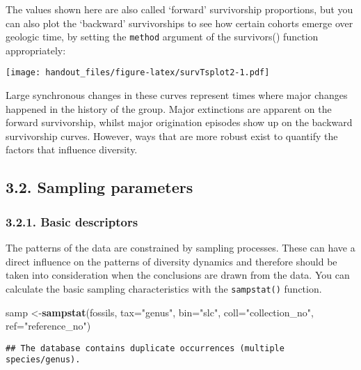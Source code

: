 \documentclass[]{article}
\newenvironment{Shaded}{\begin{snugshade}}{\end{snugshade}}
\newcommand{\KeywordTok}[1]{\textcolor[rgb]{0.13,0.29,0.53}{\textbf{{#1}}}}
\newcommand{\DataTypeTok}[1]{\textcolor[rgb]{0.13,0.29,0.53}{{#1}}}
\newcommand{\StringTok}[1]{\textcolor[rgb]{0.31,0.60,0.02}{{#1}}}
\newcommand{\NormalTok}[1]{{#1}}
\begin{document}
The values shown here are also called `forward' survivorship
proportions, but you can also plot the `backward' survivorships to see
how certain cohorts emerge over geologic time, by setting the
\texttt{method} argument of the survivors() function appropriately:

\texttt{[image: handout\_files/figure-latex/survTsplot2-1.pdf]}

Large synchronous changes in these curves represent times where major
changes happened in the history of the group. Major extinctions are
apparent on the forward survivorship, whilst major origination episodes
show up on the backward survivorship curves. However, ways that are more
robust exist to quantify the factors that influence diversity.

\subsection{3.2. Sampling parameters}\label{sampling-parameters}

\subsubsection{3.2.1. Basic descriptors}\label{basic-descriptors}

The patterns of the data are constrained by sampling processes. These
can have a direct influence on the patterns of diversity dynamics and
therefore should be taken into consideration when the conclusions are
drawn from the data. You can calculate the basic sampling
characteristics with the \texttt{sampstat()} function.

\begin{Shaded}
\begin{Highlighting}[]
\NormalTok{samp <-}\KeywordTok{sampstat}\NormalTok{(fossils, }\DataTypeTok{tax=}\StringTok{"genus"}\NormalTok{, }\DataTypeTok{bin=}\StringTok{"slc"}\NormalTok{, }
  \DataTypeTok{coll=}\StringTok{"collection_no"}\NormalTok{, }\DataTypeTok{ref=}\StringTok{"reference_no"}\NormalTok{)}
\end{Highlighting}
\end{Shaded}

\begin{verbatim}
## The database contains duplicate occurrences (multiple species/genus).
\end{verbatim}
\end{document}
